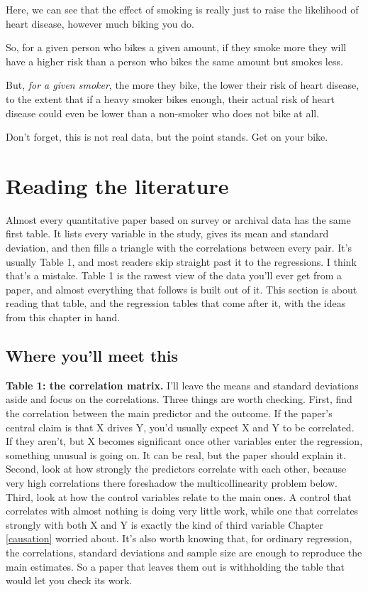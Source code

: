\documentclass[
]{book}
\begin{document}
Here, we can see that the effect of smoking is really just to raise the likelihood of heart disease, however much biking you do.

So, for a given person who bikes a given amount, if they smoke more they will have a higher risk than a person who bikes the same amount but smokes less.

But, \emph{for a given smoker}, the more they bike, the lower their risk of heart disease, to the extent that if a heavy smoker bikes enough, their actual risk of heart disease could even be lower than a non-smoker who does not bike at all.

Don't forget, this is not real data, but the point stands. Get on your bike.

\section{Reading the literature}\label{assoc-rel-reading}

Almost every quantitative paper based on survey or archival data has the same first table. It lists every variable in the study, gives its mean and standard deviation, and then fills a triangle with the correlations between every pair. It's usually Table 1, and most readers skip straight past it to the regressions. I think that's a mistake. Table 1 is the rawest view of the data you'll ever get from a paper, and almost everything that follows is built out of it. This section is about reading that table, and the regression tables that come after it, with the ideas from this chapter in hand.

\subsection{Where you'll meet this}\label{where-youll-meet-this-3}

\textbf{Table 1: the correlation matrix.} I'll leave the means and standard deviations aside and focus on the correlations. Three things are worth checking. First, find the correlation between the main predictor and the outcome. If the paper's central claim is that X drives Y, you'd usually expect X and Y to be correlated. If they aren't, but X becomes significant once other variables enter the regression, something unusual is going on. It can be real, but the paper should explain it. Second, look at how strongly the predictors correlate with each other, because very high correlations there foreshadow the multicollinearity problem below. Third, look at how the control variables relate to the main ones. A control that correlates with almost nothing is doing very little work, while one that correlates strongly with both X and Y is exactly the kind of third variable Chapter \ref{causation} worried about. It's also worth knowing that, for ordinary regression, the correlations, standard deviations and sample size are enough to reproduce the main estimates. So a paper that leaves them out is withholding the table that would let you check its work.
\end{document}
